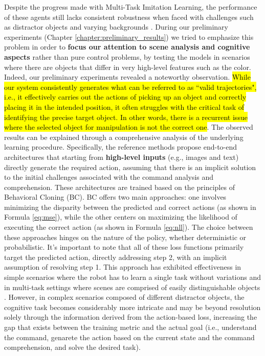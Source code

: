 Despite the progress made with Multi-Task Imitation Learning, the performance of these agents still lacks consistent robustness when faced with challenges such as distractor objects and varying backgrounds \cite{brohan2022rt}. During our preliminary experiments (Chapter \ref{chapter:preliminary_results}) we tried to emphasize this problem in order to \textbf{focus our attention to scene analysis and cognitive aspects} rather than pure control problems, by testing the models in scenarios where there are objects that differ in very high-level features such as the color. Indeed, our preliminary experiments revealed a noteworthy observation. \hl{While our system consistently generates what can be referred to as ``valid trajectories", i.e., it effectively carries out the actions of picking up an object and correctly placing it in the intended position, it often struggles with the critical task of identifying the precise target object. In other words, there is a recurrent issue where the selected object for manipulation is not the correct one}.
\newline The observed results can be explained through a comprehensive analysis of the underlying learning procedure. Specifically, the reference methods \cite{dasari2021transformers_one_shot,mandi2022towards_more_generalizable_one_shot,brohan2022rt} propose end-to-end architectures that starting from \textbf{high-level inputs} (e.g., images and text) directly generate the required action, assuming that there is an implicit solution to the initial challenges associated with the command analysis and comprehension. These architectures are trained based on the principles of Behavioral Cloning (BC). BC offers two main approaches: one involves minimizing the disparity between the predicted and correct actions (as shown in Formula \ref{eq:mse}), while the other centers on maximizing the likelihood of executing the correct action (as shown in Formula \ref{eq:nll}). The choice between these approaches hinges on the nature of the policy, whether deterministic or probabilistic. It's important to note that all of these loss functions primarily target the predicted action, directly addressing step 2, with an implicit assumption of resolving step 1. This approach has exhibited effectiveness in simple scenarios where the robot has to learn a single task without variations \cite{zhang2018deep_vr_teleoperation,duan2017one_shot_il} and in multi-task settings where scenes are comprised of easily distinguishable objects \cite{dasari2021transformers_one_shot,mandi2022towards_more_generalizable_one_shot,brohan2022rt}. However, in complex scenarios composed of different distractor objects, the cognitive task becomes considerably more intricate and may be beyond resolution solely through the information derived from the action-based loss, increasing the gap that exists between the training metric and the actual goal (i.e., understand the command, genarete the action based on the current state and the command comprehension, and solve the desired task).
